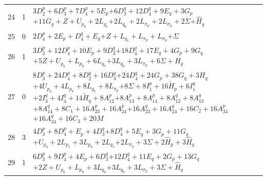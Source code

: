 \documentclass[11pt,a4paper]{article}
\theoremstyle{remark}
\begin{document}
\begin{longtable}{rrp{12.7cm}}
24&1&\( 3D_2^p + 6D_3^p + 7D_4^p + 5E_p \)\newline\( + 6D_3^q + 12D_4^q + 9E_q + 3G_p \)\newline\( + 11G_q + Z + U_{p_{0}} + 2L_{q_{5}} \)\newline\( + 2L_{q_{6}} + 2L_{\pi_p} + 2L_{\sigma_q} + 2\Sigma \)\newline\( + \widehat H_q \)\\[3pt]
25&0&\( 2D_4^p + 2E_p + D_4^q + E_q \)\newline\( + Z + L_{q_{5}} + L_{\pi_p} + L_{\sigma_p} \)\newline\( + \Sigma \)\\[3pt]
26&1&\( 3D_3^p + 12D_4^p + 10E_p + 9D_3^q \)\newline\( + 18D_4^q + 17E_q + 4G_p + 9G_q \)\newline\( + 5Z + U_{p_{0}} + L_{p_{9}} + 6L_{q_{7}} \)\newline\( + 3L_{q_{9}} + 3L_{\pi_p} + 6\Sigma + \widehat H_q \)\\[3pt]
27&0&\( 8D_3^p + 24D_4^p + 8D_2^q + 16D_3^q \)\newline\( + 24D_4^q + 24G_p + 38G_q + 3H_q \)\newline\( + 4U_{p_{0}} + 4L_{p_{8}} + 8L_{q_{7}} + 8L_{\pi_p} \)\newline\( + 8\Sigma + 8I_1^p + 16\widetilde H_p + 6I_1^q \)\newline\( + 2I_3^q + 4I_4^q + 14\widetilde H_q + 8A_{12}^p \)\newline\( + 8A_{13}^p + 8A_{14}^p + 8A_{12}^q + 8A_{13}^q \)\newline\( + 8A_{14}^q + 8C_1 + 16A_{23}^p + 16A_{24}^p \)\newline\( + 16A_{23}^q + 16A_{24}^q + 16C_2 + 16A_{34}^p \)\newline\( + 16A_{34}^q + 16C_3 + 20M \)\\[3pt]
28&3&\( 4D_3^p + 8D_4^p + E_p + 4D_3^q \)\newline\( + 8D_4^q + 5E_q + 3G_p + 11G_q \)\newline\( + U_{p_{0}} + 2L_{p_{5}} + 3L_{p_{8}} + 2L_{q_{5}} \)\newline\( + 2L_{\sigma_q} + 3\Sigma + 2\widehat H_p + 3\widehat H_q \)\\[3pt]
29&1&\( 6D_3^p + 9D_4^p + 4E_p + 6D_3^q \)\newline\( + 12D_4^q + 11E_q + 2G_p + 13G_q \)\newline\( + 2Z + U_{p_{0}} + L_{p_{9}} + 3L_{q_{6}} \)\newline\( + 3L_{q_{9}} + 3L_{\sigma_p} + 3\Sigma + \widehat H_q \)\\[3pt]

\end{longtable}
\end{document}
